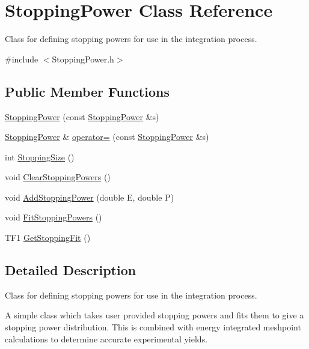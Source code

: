 \hypertarget{classStoppingPower}{\section{Stopping\-Power Class Reference}
\label{classStoppingPower}
}


Class for defining stopping powers for use in the integration process.  




{\ttfamily \#include $<$Stopping\-Power.\-h$>$}

\subsection*{Public Member Functions}
\begin{DoxyCompactItemize}
\item 
\hyperlink{classStoppingPower_ae5ca4a286c101818e1cd2b0560f62f19}{Stopping\-Power} (const \hyperlink{classStoppingPower}{Stopping\-Power} \&s)
\item 
\hyperlink{classStoppingPower}{Stopping\-Power} \& \hyperlink{classStoppingPower_a636e5d85fb175caf9debcd1fef1d7b7e}{operator=} (const \hyperlink{classStoppingPower}{Stopping\-Power} \&s)
\item 
int \hyperlink{classStoppingPower_aa6ff3fb148b0b78a86c0a57f5f8956b5}{Stopping\-Size} ()
\item 
void \hyperlink{classStoppingPower_aff5dcc4ee493ae9daa1d67840210e72e}{Clear\-Stopping\-Powers} ()
\item 
void \hyperlink{classStoppingPower_a1d0b0d813ac4d1200f1d37af7fcf3231}{Add\-Stopping\-Power} (double E, double P)
\item 
void \hyperlink{classStoppingPower_a907782bf5a89ed848f1ff44552fe12c8}{Fit\-Stopping\-Powers} ()
\item 
T\-F1 \hyperlink{classStoppingPower_a6f3943ee06776e20b59398e4c94755bc}{Get\-Stopping\-Fit} ()
\end{DoxyCompactItemize}


\subsection{Detailed Description}
Class for defining stopping powers for use in the integration process. 

A simple class which takes user provided stopping powers and fits them to give a stopping power distribution. This is combined with energy integrated meshpoint calculations to determine accurate experimental yields. 

